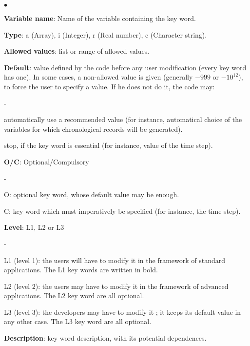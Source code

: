 \begin{list}{$\bullet$}{}
\item \textbf{Variable name}: Name of the variable containing the key word.

\item \textbf{Type}: a (Array), i (Integer), r (Real number), c
      (Character string).

\item \textbf{Allowed values}: list or range of allowed values.

\item \textbf{Default}: value defined by the code before any user
      modification (every key word has one). In some cases, a
      non-allowed value is given (generally $-999$ or $-10^{12}$), to force the
      user to specify a value. If he does not do it, the code may:
\begin{list}{-}{}
\item automatically use a recommended value (for instance, automatical
      choice of the variables for which chronological records will be
      generated).

\item stop, if the key word is essential (for instance, value of the
      time step).
\end{list}

\item \textbf{O/C}: Optional/Compulsory
\begin{list}{-}{}
\item O: optional key word, whose default value may be enough.

\item C: key word which must imperatively be specified (for instance,
      the time step).
\end{list}

\item \textbf{Level}: L1, L2 or L3
\begin{list}{-}{}
\item L1 (level 1): the users will have to modify it in the framework of
      standard applications. The L1 key words are written in bold.

\item L2 (level 2): the users may have to modify it in the framework of
      advanced applications. The L2 key word are all optional.

\item L3 (level 3): the developers may have to modify it ; it keeps its
      default value in any other case. The L3 key word are all optional.
\end{list}

\item \textbf{Description}:  key word description, with its potential
      dependences.

\end{list}


